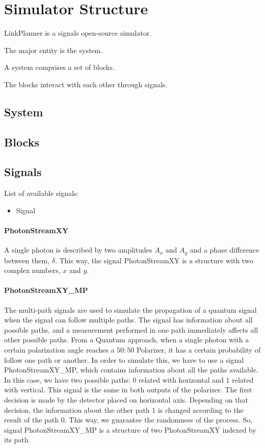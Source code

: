 
\chapter{Simulator Structure}

LinkPlanner is a signals open-source simulator.

The major entity is the system.

A system comprises a set of blocks.

The blocks interact with each other through signals.

\section{System}

\section{Blocks}

\section{Signals}

List of available signals:

\begin{itemize}
    \item Signal

\end{itemize}

\subsubsection{PhotonStreamXY}
A single photon is described by two amplitudes $A_x$ and $A_y$ and a phase difference between them, $\delta$. This way, the signal PhotonStreamXY is a structure with two complex numbers, $x$ and $y$.


\subsubsection{PhotonStreamXY\_MP}
The multi-path signals are used to simulate the propagation of a quantum signal when the signal can follow multiple paths. The signal has information about all possible paths, and a measurement performed in one path immediately affects all other possible paths.
From a Quantum approach, when a single photon with a certain polarization angle reaches a $50:50$ Polarizer, it has a certain probability of follow one path or another. In order to simulate this, we have to use a signal PhotonStreamXY\_MP, which contains information about all the paths available. In this case, we have two possible paths: $0$ related with horizontal and $1$ related with vertical. This signal is the same in both outputs of the polarizer. The first decision is made by the detector placed on horizontal axis. Depending on that decision, the information about the other path $1$ is changed according to the result of the path $0$. This way, we guarantee the randomness of the process. So, signal PhotonStreamXY\_MP is a structure of two PhotonStreamXY indexed by its path.








